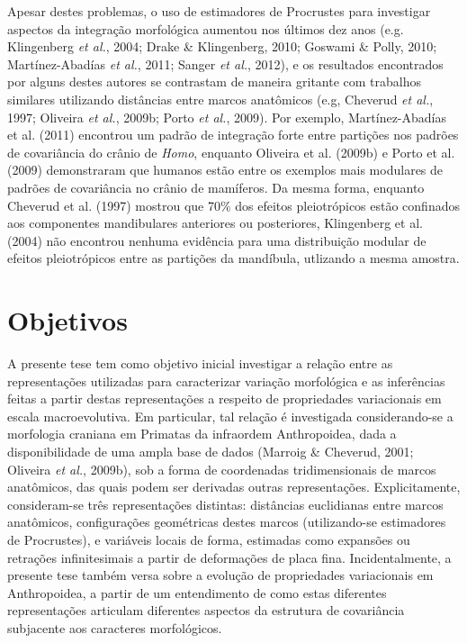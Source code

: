 \documentclass[12pt,twoside]{report}
\begin{document}
Apesar destes problemas, o uso de estimadores de Procrustes para
investigar aspectos da integração morfológica aumentou nos últimos dez
anos (e.g. Klingenberg \emph{et al.}, 2004; Drake \& Klingenberg, 2010;
Goswami \& Polly, 2010; Martínez-Abadías \emph{et al.}, 2011; Sanger
\emph{et al.}, 2012), e os resultados encontrados por alguns destes
autores se contrastam de maneira gritante com trabalhos similares
utilizando distâncias entre marcos anatômicos (e.g, Cheverud \emph{et
al.}, 1997; Oliveira \emph{et al.}, 2009b; Porto \emph{et al.}, 2009).
Por exemplo, Martínez-Abadías et al. (2011) encontrou um padrão de
integração forte entre partições nos padrões de covariância do crânio de
\emph{Homo}, enquanto Oliveira et al. (2009b) e Porto et al. (2009)
demonstraram que humanos estão entre os exemplos mais modulares de
padrões de covariância no crânio de mamíferos. Da mesma forma, enquanto
Cheverud et al. (1997) mostrou que 70\% dos efeitos pleiotrópicos estão
confinados aos componentes mandibulares anteriores ou posteriores,
Klingenberg et al. (2004) não encontrou nenhuma evidência para uma
distribuição modular de efeitos pleiotrópicos entre as partições da
mandíbula, utlizando a mesma amostra.

\section{Objetivos}\label{objetivos}

A presente tese tem como objetivo inicial investigar a relação entre as
representações utilizadas para caracterizar variação morfológica e as
inferências feitas a partir destas representações a respeito de
propriedades variacionais em escala macroevolutiva. Em particular, tal
relação é investigada considerando-se a morfologia craniana em Primatas
da infraordem Anthropoidea, dada a disponibilidade de uma ampla base de
dados (Marroig \& Cheverud, 2001; Oliveira \emph{et al.}, 2009b), sob a
forma de coordenadas tridimensionais de marcos anatômicos, das quais
podem ser derivadas outras representações. Explicitamente, consideram-se
três representações distintas: distâncias euclidianas entre marcos
anatômicos, configurações geométricas destes marcos (utilizando-se
estimadores de Procrustes), e variáveis locais de forma, estimadas como
expansões ou retrações infinitesimais a partir de deformações de placa
fina. Incidentalmente, a presente tese também versa sobre a evolução de
propriedades variacionais em Anthropoidea, a partir de um entendimento
de como estas diferentes representações articulam diferentes aspectos da
estrutura de covariância subjacente aos caracteres morfológicos.
\end{document}
